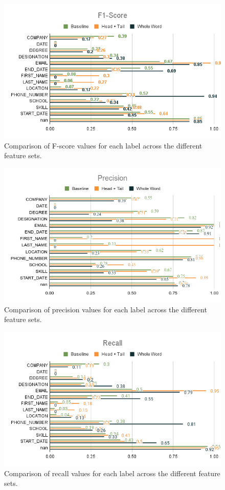   \begin{figure}[ht!]
    \centering
    \includegraphics[width=\columnwidth]{comparison_chart.png}
    \caption{%
      Comparison of F-score values for each label across the different feature
      sets.
    }
    \label{figure:2}
  \end{figure}
  \begin{figure}[ht!]
    \centering
    \includegraphics[width=\columnwidth]{p_comparison_chart.png}
    \caption{%
      Comparison of precision values for each label across the different feature
      sets.
    }
    \label{figure:3}
  \end{figure}
  \begin{figure}[ht!]
    \centering
    \includegraphics[width=\columnwidth]{r_comparison_chart.png}
    \caption{%
      Comparison of recall values for each label across the different feature
      sets.
    }
    \label{figure:4}
  \end{figure}


